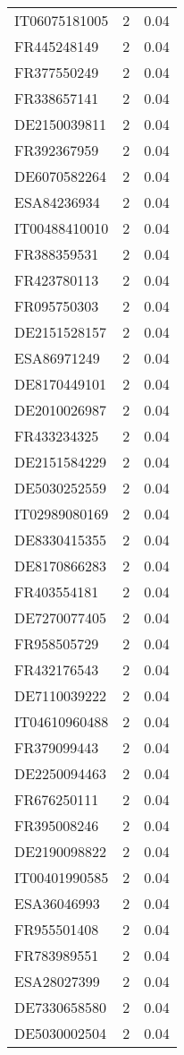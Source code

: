 \begin{table*}[htbp]
\begin{tabular}{lrr}
IT06075181005 & 2 & 0.04 \\
FR445248149 & 2 & 0.04 \\
FR377550249 & 2 & 0.04 \\
FR338657141 & 2 & 0.04 \\
DE2150039811 & 2 & 0.04 \\
FR392367959 & 2 & 0.04 \\
DE6070582264 & 2 & 0.04 \\
ESA84236934 & 2 & 0.04 \\
IT00488410010 & 2 & 0.04 \\
FR388359531 & 2 & 0.04 \\
FR423780113 & 2 & 0.04 \\
FR095750303 & 2 & 0.04 \\
DE2151528157 & 2 & 0.04 \\
ESA86971249 & 2 & 0.04 \\
DE8170449101 & 2 & 0.04 \\
DE2010026987 & 2 & 0.04 \\
FR433234325 & 2 & 0.04 \\
DE2151584229 & 2 & 0.04 \\
DE5030252559 & 2 & 0.04 \\
IT02989080169 & 2 & 0.04 \\
DE8330415355 & 2 & 0.04 \\
DE8170866283 & 2 & 0.04 \\
FR403554181 & 2 & 0.04 \\
DE7270077405 & 2 & 0.04 \\
FR958505729 & 2 & 0.04 \\
FR432176543 & 2 & 0.04 \\
DE7110039222 & 2 & 0.04 \\
IT04610960488 & 2 & 0.04 \\
FR379099443 & 2 & 0.04 \\
DE2250094463 & 2 & 0.04 \\
FR676250111 & 2 & 0.04 \\
FR395008246 & 2 & 0.04 \\
DE2190098822 & 2 & 0.04 \\
IT00401990585 & 2 & 0.04 \\
ESA36046993 & 2 & 0.04 \\
FR955501408 & 2 & 0.04 \\
FR783989551 & 2 & 0.04 \\
ESA28027399 & 2 & 0.04 \\
DE7330658580 & 2 & 0.04 \\
DE5030002504 & 2 & 0.04 \\

\end{tabular}
\end{table*}
